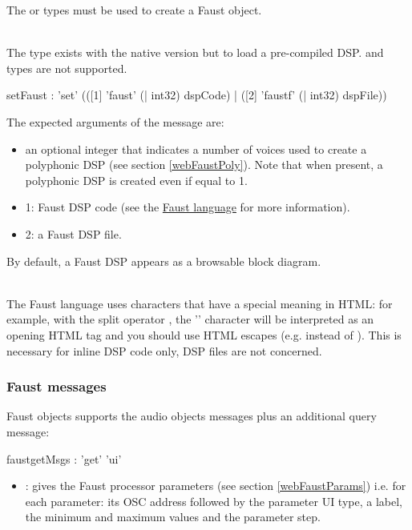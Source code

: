\documentclass[a4paper,twoside]{article}
\newcommand{\subsublevel}[1]	{\subsubsection{#1}}
\begin{document}
The  or  types must be used to create a Faust object.

\note{}\\
The  type exists with the native version but to load a pre-compiled DSP.  and  types are not supported.

\begin{rail}
setFaust : 'set' (([1] 'faust' (| int32) dspCode)
				| ([2] 'faustf' (| int32) dspFile))

\end{rail}

The expected arguments of the  message are:
\begin{itemize}
\item an optional integer that indicates a number of voices used to create a polyphonic DSP (see section \ref{webFaustPoly}). Note that when present, a polyphonic DSP is created even if equal to 1.
\item 1: Faust DSP code (see the \href{https://faustdoc.grame.fr/}{Faust language} for more information).
\item 2: a Faust DSP file.
\end{itemize}

By default, a Faust DSP appears as a browsable block diagram.

\note{}\\
The Faust language uses characters that have a special meaning in HTML: for example, with the split operator \OSC{<:}, the '\OSC{<}' character will be interpreted as an opening HTML tag and you should use HTML escapes (e.g.  instead of \OSC{<}). This is necessary for inline DSP code only, DSP files are not concerned.

\subsublevel{Faust messages}
\label{webFaustMsgs}

Faust objects supports the audio objects messages plus an additional query message:

\begin{rail}
faustgetMsgs : 'get' 'ui'
\end{rail}

\begin{itemize}
\item {}: gives the Faust processor parameters (see section \ref{webFaustParams}) i.e. for each parameter: its OSC address followed by the parameter UI type, a label, the minimum and maximum values and the parameter step.
\end{itemize}
\end{document}
